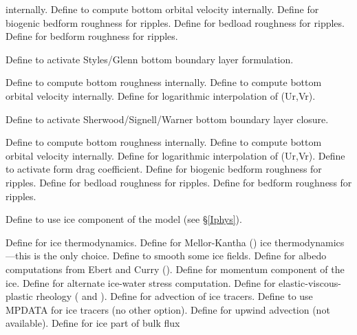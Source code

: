 \begin{klist}
\begin{klist}
\begin{klist}
      internally.
         Define to compute bottom orbital velocity
    internally.
         Define for biogenic bedform roughness for
    ripples.
         Define for bedload roughness for ripples.
         Define for bedform roughness for ripples.
      \end{klist}
       Define to activate Styles/Glenn bottom
   boundary layer formulation.
      \begin{klist}
         Define to compute bottom roughness
     internally.
         Define to compute bottom orbital velocity
    internally.
          Define for logarithmic interpolation of
     (Ur,Vr).
      \end{klist}
       Define to activate Sherwood/Signell/Warner bottom
    boundary layer closure.
      \begin{klist}
         Define to compute bottom roughness
     internally.
         Define to compute bottom orbital velocity
    internally.
          Define for logarithmic interpolation of
     (Ur,Vr).
         Define to activate form drag
     coefficient.
         Define for biogenic bedform roughness for
    ripples.
         Define for bedload roughness for ripples.
         Define for bedform roughness for ripples.
      \end{klist}
  \end{klist}
  Define to use ice component of the model (see
    \S\ref{Iphys}).
      \begin{klist}
         Define for ice thermodynamics.
         Define for Mellor-Kantha (\cite{Mellor89})
	ice thermodynamics---this is the only choice.
	 Define to smooth some ice fields.
	 Define for albedo computations from Ebert
	and Curry (\cite{Ebert93}).
	 Define for momentum component of the ice.
	 Define for alternate ice-water stress
	computation.
	 Define for elastic-viscous-plastic rheology
	(\cite{Hunke97} and \cite{Hunke_2001}).
	 Define for advection of ice tracers.
	 Define to use MPDATA for ice tracers (no
	other option).
	 Define for upwind advection (not available).
	 Define for ice part of bulk flux

\end{klist}
\end{klist}

